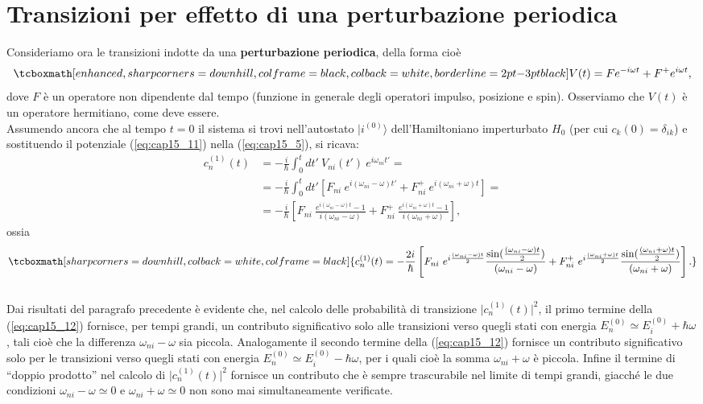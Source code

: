 \section{Transizioni per effetto di una perturbazione periodica}
Consideriamo ora le transizioni indotte da una \textbf{perturbazione periodica}, della forma cioè
	\begin{equation}
		\tcboxmath[enhanced, sharp corners=downhill, colframe=black, colback=white, borderline={2pt}{-3pt}{black}]{
			V(t) = Fe^{-i\omega t} + F^+ e ^{i\omega t},
			}
	\label{eq:cap15_11}
	\end{equation}
dove $F$ è un operatore non dipendente dal tempo (funzione in generale degli operatori impulso, posizione e spin). Osserviamo che $V(t)$ è un operatore hermitiano, come deve essere.	\\

Assumendo ancora che al tempo $t=0$ il sistema si trovi nell'autostato $\vert i ^{(0)}\rangle$ dell'Hamiltoniano imperturbato $H_0$ (per cui $c_k (0) = \delta _{ik}$) e sostituendo il potenziale (\ref{eq:cap15_11}) nella (\ref{eq:cap15_5}), si ricava:
	\begin{align}
		c_n ^{(1)}(t) & =  -\frac{i}{\hbar}\int _0 ^t dt'\ V_{ni} (t') \ e^{i\omega _{ni}t'} = \nonumber \\
		&= -\frac{i}{\hbar}\int _0 ^t dt'\left[ F_{ni}\ e^{i(\omega _{ni}-\omega) t'} + F_{ni} ^+\ e ^{i(\omega _{ni} +\omega) t}\right] = \nonumber \\
		&= -\frac{i}{\hbar}\left[ F_{ni}\ \frac{e^{i(\omega _{ni}-\omega) t}-1}{i(\omega _{ni}-\omega)} + F_{ni} ^+\ \frac{e ^{i(\omega _{ni} +\omega) t}-1}{i(\omega _{ni}+\omega)}\right], 
	\end{align}
ossia
	\begin{equation}
		\tcboxmath[sharp corners=downhill, colback=white, colframe=black]{
			c_n ^{(1)}(t)= -\frac{2i}{\hbar}\left[ F_{ni}\ e^{i\frac{(\omega _{ni}-\omega) t}{2}}\frac{\sin(\frac{(\omega _{ni}-\omega) t}{2})}{(\omega _{ni}-\omega)}  + F_{ni} ^+\ e^{i\frac{(\omega _{ni}+\omega) t}{2}}\frac{\sin(\frac{(\omega _{ni}+\omega) t}{2})}{(\omega _{ni}+\omega)}\right].
			}
	\label{eq:cap15_12}
	\end{equation}\\
	
Dai risultati del paragrafo precedente è evidente che, nel calcolo delle probabilità di transizione $\vert c_n ^{(1)}(t)\vert ^2$, il primo termine della (\ref{eq:cap15_12}) fornisce, per tempi grandi, un contributo significativo solo alle transizioni verso quegli stati con energia $E_n ^{(0)} \simeq E_i ^{(0)}+ \hbar \omega $, tali cioè che la differenza  $\omega _{ni} - \omega$ sia piccola. Analogamente il secondo termine della (\ref{eq:cap15_12}) fornisce un contributo significativo solo per le transizioni verso quegli stati con energia  $E_n ^{(0)} \simeq E_i ^{(0)}- \hbar \omega $, per i quali cioè la somma $\omega _{ni} + \omega$ è piccola. Infine  il termine di ``doppio prodotto'' nel calcolo di  $\vert c_n ^{(1)}(t)\vert ^2$ fornisce un contributo che è sempre trascurabile nel limite di tempi grandi, giacché le due condizioni $\omega _{ni} - \omega\simeq 0$ e $\omega _{ni} + \omega\simeq 0$ non sono mai simultaneamente verificate.\\

